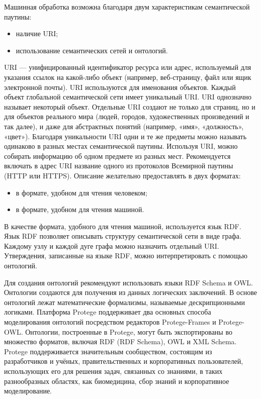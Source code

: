 Машинная обработка возможна благодаря двум характеристикам семантической паутины:
\begin{itemize}
	\item наличие URI;
	\item использование семантических сетей и онтологий. 
\end{itemize}

URI — унифицированный идентификатор ресурса или адрес, используемый для указания ссылок на какой-либо объект (например, веб-страницу, файл или ящик электронной почты). URI используются для именования объектов. Каждый объект глобальной семантической сети имеет уникальный URI. URI однозначно называет некоторый объект. Отдельные URI создают не только для страниц, но и для объектов реального мира (людей, городов, художественных произведений и так далее), и даже для абстрактных понятий (например, «имя», «должность», «цвет»). Благодаря уникальности URI одни и те же предметы можно называть одинаково в разных местах семантической паутины. Используя URI, можно собирать информацию об одном предмете из разных мест. Рекомендуется включать в адрес URI название одного из протоколов Всемирной паутины (HTTP или HTTPS).
Описание желательно предоставлять в двух форматах:
\begin{itemize}
	\item в  формате, удобном для чтения человеком;
	\item в формате, удобном для чтения машиной.
\end{itemize}

В качестве формата, удобного для чтения машиной, используется язык RDF. Язык RDF позволяет описывать структуру семантической сети в виде графа. Каждому узлу и каждой дуге графа можно назначить отдельный URI. Утверждения, записанные на языке RDF, можно интерпретировать с помощью онтологий.

Для создания онтологий рекомендуют использовать языки RDF Schema и OWL. Онтологии создаются для получения из данных логических заключений. В основе онтологий лежат математические формализмы, называемые дескрипционными логиками.
Платформа Protege поддерживает два основных способа моделирования онтологий посредством редакторов Protege-Frames и Protege-OWL. Онтологии, построенные в Protege, могут быть экспортированы во множество форматов, включая RDF (RDF Schema), OWL и XML Schema.
Protege поддерживается значительным сообществом, состоящим из разработчиков и учёных, правительственных и корпоративных пользователей, использующих его для решения задач, связанных со знаниями, в таких разнообразных областях, как биомедицина, сбор знаний и корпоративное моделирование.

